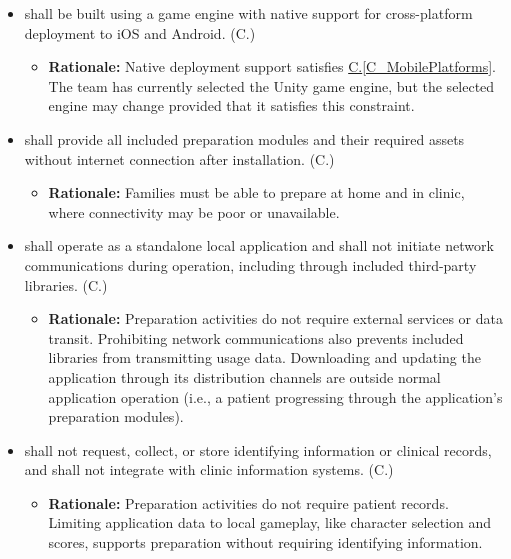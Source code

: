 \documentclass[12pt]{article}
\newcounter{connum} %
\newcommand{\conref}[1]{\hyperref[#1]{C.\ref*{#1}}}
\begin{document}
\begin{itemize}
    \item \progname{} shall be built using a game engine with native support
    for cross-platform deployment to iOS and Android.
    (C.\theconnum\label{C_CrossPlatformEngine})
    \begin{itemize}
        \item \textbf{Rationale:} Native deployment support satisfies \conref{C_MobilePlatforms}. The team has
        currently selected the Unity game engine, but the selected engine may
        change provided that it satisfies this constraint.
    \end{itemize}

    \item \progname{} shall provide all included preparation modules and their
    required assets without internet connection after installation.
    (C.\theconnum\label{C_OfflineOperation})
    \begin{itemize}
        \item \textbf{Rationale:} Families must be able to prepare at home and
        in clinic, where connectivity may be poor or unavailable.
    \end{itemize}

    \item \progname{} shall operate as a standalone local application and shall
    not initiate network communications during operation, including
    through included third-party libraries.
    (C.\theconnum\label{C_NoNetworkCommunications})
    \begin{itemize}
        \item \textbf{Rationale:} Preparation activities do not require external
        services or data transit. Prohibiting network
        communications also prevents included libraries from transmitting usage
        data. Downloading and updating the application through its distribution
        channels are outside normal application operation (i.e., a patient progressing through the application's
        preparation modules).
    \end{itemize}

    \item \progname{} shall not request, collect, or store identifying
    information or clinical records, and shall not integrate with clinic
    information systems.
    (C.\theconnum\label{C_PatientPrivacy})
    \begin{itemize}
        \item \textbf{Rationale:} Preparation activities do not require patient
        records. Limiting application data to local gameplay, like character selection and scores,
        supports preparation without requiring identifying information.
    \end{itemize}


\end{itemize}
\end{document}
